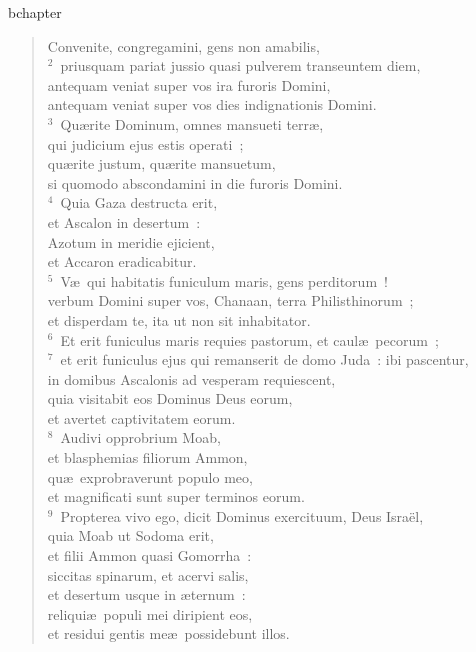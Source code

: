 bchapter\begin{verse}\vspace{-19pt}Convenite, congregamini, gens non amabilis,\\
${}^{2}$~priusquam pariat jussio quasi pulverem transeuntem diem,\\ antequam veniat super vos ira furoris Domini,\\ antequam veniat super vos dies indignationis Domini.\\
${}^{3}$~Qu\ae rite Dominum, omnes mansueti terr\ae ,\\ qui judicium ejus estis operati~;\\ qu\ae rite justum, qu\ae rite mansuetum,\\ si quomodo abscondamini in die furoris Domini.\\
${}^{4}$~Quia Gaza destructa erit,\\ et Ascalon in desertum~:\\ Azotum in meridie ejicient,\\ et Accaron eradicabitur.\\
${}^{5}$~V\ae\ qui habitatis funiculum maris, gens perditorum~!\\ verbum Domini super vos, Chanaan, terra Philisthinorum~;\\ et disperdam te, ita ut non sit inhabitator.\\
${}^{6}$~Et erit funiculus maris requies pastorum, et caul\ae\ pecorum~;\\
${}^{7}$~et erit funiculus ejus qui remanserit de domo Juda~: ibi pascentur,\\ in domibus Ascalonis ad vesperam requiescent,\\ quia visitabit eos Dominus Deus eorum,\\ et avertet captivitatem eorum.\\
${}^{8}$~Audivi opprobrium Moab,\\ et blasphemias filiorum Ammon,\\ qu\ae\ exprobraverunt populo meo,\\ et magnificati sunt super terminos eorum.\\
${}^{9}$~Propterea vivo ego, dicit Dominus exercituum, Deus Isra\"el,\\ quia Moab ut Sodoma erit,\\ et filii Ammon quasi Gomorrha~:\\ siccitas spinarum, et acervi salis,\\ et desertum usque in \ae ternum~:\\ reliqui\ae\ populi mei diripient eos,\\ et residui gentis me\ae\ possidebunt illos.\\

\end{verse}
